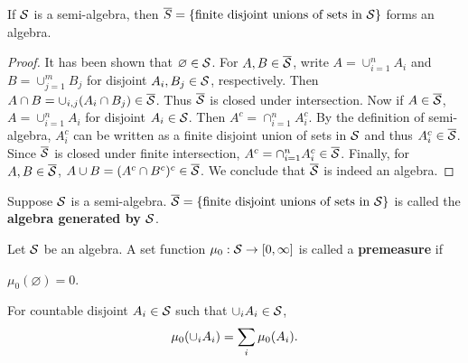 \begin{lemma}\label{lem:semi-algebra}
    If $\S$ is a semi-algebra, then $\overline{S} = \set{\text{finite disjoint unions of sets in } \S}$ 
    forms an algebra.
\end{lemma}
\begin{proof}
    It has been shown that $\varnothing\in\S$. For $A,B\in\overline{\S}$, 
    write $A = \cup_{i=1}^n A_i$ and $B = \cup_{j=1}^m B_j$ for disjoint $A_i, B_j\in\S$, 
    respectively. Then $A\cap B = \cup_{i,j} (A_i\cap B_j)\in\overline{\S}$. 
    Thus $\overline{\S}$ is closed under intersection. Now if $A\in\overline{\S}$, 
    $A = \cup_{i=1}^n A_i$ for disjoint $A_i\in\S$. Then 
    $A^c = \cap_{i=1}^n A_i^c$. By the definition of semi-algebra, 
    $A_i^c$ can be written as a finite disjoint union of sets in $\S$ 
    and thus $A_i^c\in\overline{\S}$. Since $\overline{\S}$ is closed 
    under finite intersection, $A^c = \cap_{i=1}^n A_i^c\in\overline{\S}$. 
    Finally, for $A, B\in\overline{\S}$, $A\cup B = (A^c\cap B^c)^c\in\overline{\S}$.
    We conclude that $\overline{\S}$ is indeed an algebra.
\end{proof}

\begin{definition}
    Suppose $\S$ is a semi-algebra. $\overline{\S} = 
    \set{\text{finite disjoint unions of sets in } \S}$ is called the 
    \textbf{algebra generated by $\S$}.
\end{definition}

\begin{definition}
    Let $\S$ be an algebra. A set function $\mu_0:\S\to[0,\infty]$ 
    is called a \textbf{premeasure} if
    \begin{thmenum}
        \item $\mu_0(\varnothing) = 0$. 
        \item For countable disjoint $A_i\in\S$ such that $\cup_i A_i\in\S$, 
        \begin{equation*}
            \mu_0\pth{\cup_i A_i} = \sum_i \mu_0(A_i).
        \end{equation*}
    \end{thmenum}
\end{definition}

